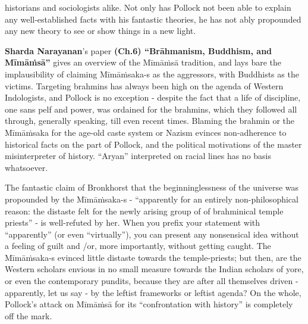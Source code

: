 historians and sociologists alike. Not only has Pollock not been able to explain any well-established facts with his fantastic theories, he has not ably propounded any new theory to see or show things in a new light.

\newpage

\textbf{Sharda Narayanan}’s paper \textbf{(Ch.6) “Brāhmanism, Buddhism, and Mīmāṁsā”} gives an overview of the Mīmāṁsā tradition, and lays bare the implausibility of claiming Mīmāṁsaka-s as the aggressors, with Buddhists as the victims. Targeting brahmins has always been high on the agenda of Western Indologists, and Pollock is no exception - despite the fact that a life of discipline, one sans pelf and power, was ordained for the brahmins, which they followed all through, generally speaking, till even recent times. Blaming the brahmin or the Mīmāṁsaka for the age-old caste system or Nazism evinces non-adherence to historical facts on the part of Pollock, and the political motivations of the master misinterpreter of history. “Aryan” interpreted on racial lines has no basis whatsoever.

The fantastic claim of Bronkhorst that the beginninglessness of the universe was propounded by the Mīmāṁsaka-s - “apparently for an entirely non-philosophical reason: the distaste felt for the newly arising group of of brahminical temple priests” - is well-refuted by her. When you prefix your statement with “apparently” (or even “virtually”), you can present any nonsensical idea without a feeling of guilt and /or, more importantly, without getting caught. The Mīmāṁsaka-s evinced little distaste towards the temple-priests; but then, are the Western scholars envious in no small measure towards the Indian scholars of yore, or even the contemporary pundits, because they are after all themselves driven - apparently, let us say - by the leftist frameworks or leftist agenda? On the whole, Pollock’s attack on Mīmāṁsā for its “confrontation with history” is completely off the mark.

